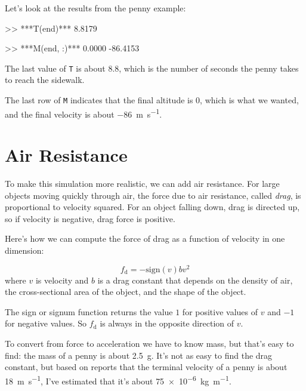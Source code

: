 Let's look at the results from the penny example:  

\begin{code}
>> ***T(end)***
8.8179

>> ***M(end, :)***
0.0000  -86.4153
\end{code}

The last value of \lstinline{T} is about 8.8, which is the number of seconds the penny takes to reach the sidewalk.

The last row of \lstinline{M} indicates that the final altitude is 0, which is what we wanted, and the final velocity is about \SI{-86}{\meter \per \second}.


\section{Air Resistance}
\label{air_resistance}


To make this simulation more realistic, we can add air resistance.
For large objects moving quickly through air, the force due to air resistance, called \emph{drag}, is proportional to velocity squared.  
For an object falling down, drag is
directed up, so if velocity is negative, drag force is positive.


Here's how we can compute the force of drag as a function of velocity in one dimension:

\begin{equation*}
    f_\mathrm{d} = -\mathrm{sign}(v) b v^2 
\end{equation*}
where $v$ is velocity and
$b$ is a drag constant that depends on the density of
air, the cross-sectional area of the object, and the shape
of the object.  

The sign or signum function returns the value $1$ for positive values of 
$v$ and $-1$ for negative values.  So $f_\mathrm{d}$ is always in the opposite direction of $v$.


To convert from force to acceleration we have to know mass, but that's easy to find: the mass of a penny is about \SI{2.5}{\gram}.  It's not as easy to find the drag constant, but based on reports that the terminal velocity of a penny is about \SI{18}{\meter \per \second}, I've estimated that it's about \SI{75e-6}{\kilogram \per \meter}.

